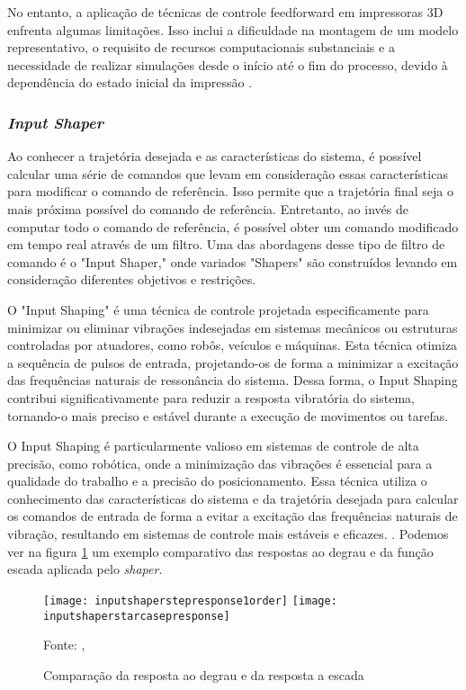 No entanto, a aplicação de técnicas de controle feedforward em impressoras 3D enfrenta algumas limitações. Isso inclui a dificuldade na montagem de um modelo representativo, o requisito de recursos computacionais substanciais e a necessidade de realizar simulações desde o início até o fim do processo, devido à dependência do estado inicial da impressão \cite{ramani20,duan18}.

\subsubsection{\textit{Input Shaper}}
Ao conhecer a trajetória desejada e as características do sistema, é possível calcular uma série de comandos que levam em consideração essas características para modificar o comando de referência. Isso permite que a trajetória final seja o mais próxima possível do comando de referência. Entretanto, ao invés de computar todo o comando de referência, é possível obter um comando modificado em tempo real através de um filtro. Uma das abordagens desse tipo de filtro de comando é o "Input Shaper," onde variados "Shapers" são construídos levando em consideração diferentes objetivos e restrições.

O "Input Shaping" é uma técnica de controle projetada especificamente para minimizar ou eliminar vibrações indesejadas em sistemas mecânicos ou estruturas controladas por atuadores, como robôs, veículos e máquinas. Esta técnica otimiza a sequência de pulsos de entrada, projetando-os de forma a minimizar a excitação das frequências naturais de ressonância do sistema. Dessa forma, o Input Shaping contribui significativamente para reduzir a resposta vibratória do sistema, tornando-o mais preciso e estável durante a execução de movimentos ou tarefas.

O Input Shaping é particularmente valioso em sistemas de controle de alta precisão, como robótica, onde a minimização das vibrações é essencial para a qualidade do trabalho e a precisão do posicionamento. Essa técnica utiliza o conhecimento das características do sistema e da trajetória desejada para calcular os comandos de entrada de forma a evitar a excitação das frequências naturais de vibração, resultando em sistemas de controle mais estáveis e eficazes.
\cite{singhose97}.
Podemos
ver na figura \ref{fig:degr_vs_esc} um exemplo comparativo
das respostas ao degrau e da função escada aplicada pelo \textit{shaper}.

\begin{figure}[H]
    \centering
    \caption{Comparação da resposta ao degrau e da resposta a escada}
    \texttt{[image: inputshaperstepresponse1order]}
    \texttt{[image: inputshaperstarcasepresponse]}

    {\footnotesize Fonte: \citeauthor{singhose97}, \citeyear{singhose97}}
    \label{fig:degr_vs_esc}
\end{figure}

